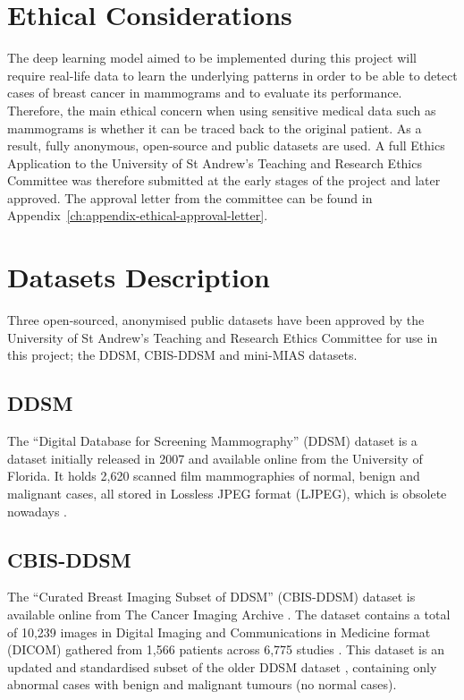 \section{Ethical Considerations}

The deep learning model aimed to be implemented during this project will require real-life data to learn the underlying patterns in order to be able to detect cases of breast cancer in mammograms and to evaluate its performance. Therefore, the main ethical concern when using sensitive medical data such as  mammograms is whether it can be traced back to the original patient. As a result, fully anonymous, open-source and public datasets are used. A full Ethics Application to the University of St Andrew's Teaching and Research Ethics Committee was therefore submitted at the early stages of the project and later approved. The approval letter from the committee can be found in Appendix~\ref{ch:appendix-ethical-approval-letter}.


\section{Datasets Description}

Three open-sourced, anonymised public datasets have been approved by the University of St Andrew's Teaching and Research Ethics Committee for use in this project; the DDSM, CBIS-DDSM and mini-MIAS datasets.

\subsection{DDSM}

The ``Digital Database for Screening Mammography'' (DDSM) dataset is a dataset initially released in 2007 and available online from the University of Florida. It holds 2,620 scanned film mammographies of normal, benign and malignant cases, all stored in Lossless JPEG format (LJPEG), which is obsolete nowadays \citep{MichaelHeathKevinBowyerDanielKopans2001}.

\subsection{CBIS-DDSM}
\label{sec:ethics-datasets-cbisddsm}

The ``Curated Breast Imaging Subset of DDSM'' (CBIS-DDSM) dataset \citep{Lee2017} is available online from The Cancer Imaging Archive \citep{Clark2013}. The dataset contains a total of 10,239 images in Digital Imaging and Communications in Medicine format (DICOM) gathered from 1,566 patients across 6,775 studies \citep{Lee2017}. This dataset is an updated and standardised subset of the older DDSM dataset \citep{DDSMdataset2001}, containing only abnormal cases with benign and malignant tumours (no normal cases).

